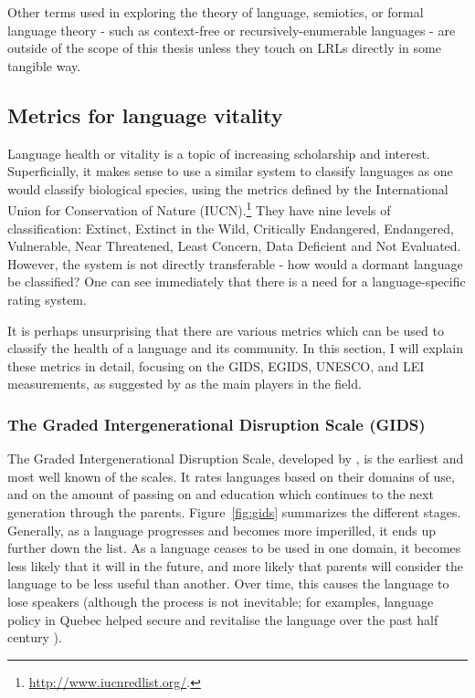 Other terms used in exploring the theory of language, semiotics, or formal language theory - such as context-free or recursively-enumerable languages - are outside of the scope of this thesis unless they touch on LRLs directly in some tangible way.

\subsection{Metrics for language vitality}
\label{subsec:metrics}

Language health or vitality is a topic of increasing scholarship and interest. Superficially, it makes sense to use a similar system to classify languages as one would classify biological species, using the metrics defined by the International Union for Conservation of Nature (IUCN).\footnote{\href{http://www.iucnredlist.org/}{http://www.iucnredlist.org/}. } They have nine levels of classification: Extinct, Extinct in the Wild, Critically Endangered, Endangered, Vulnerable, Near Threatened, Least Concern, Data Deficient and Not Evaluated. However, the system is not directly transferable - how would a dormant language be classified? One can see immediately that there is a need for a language-specific rating system.

It is perhaps unsurprising that there are various metrics which can be used to classify the health of a language and its community. In this section, I will explain these metrics in detail, focusing on the GIDS, EGIDS, UNESCO, and LEI measurements, as suggested by \citet{yang2017toward} as the main players in the field.

\subsubsection{The Graded Intergenerational Disruption Scale (GIDS)}

The Graded Intergenerational Disruption Scale, developed by \citet{fishman1991reversing}, is the earliest and most well known of the scales. It rates languages based on their domains of use, and on the amount of passing on and education which continues to the next generation through the parents. Figure~\ref{fig:gids} summarizes the different stages. Generally, as a language progresses and becomes more imperilled, it ends up further down the list. As a language ceases to be used in one domain, it becomes less likely that it will in the future, and more likely that parents will consider the language to be less useful than another. Over time, this causes the language to lose speakers (although the process is not inevitable; for examples, language policy in Quebec helped secure and revitalise the language over the past half century \citep{bourhis2001reversing}).

